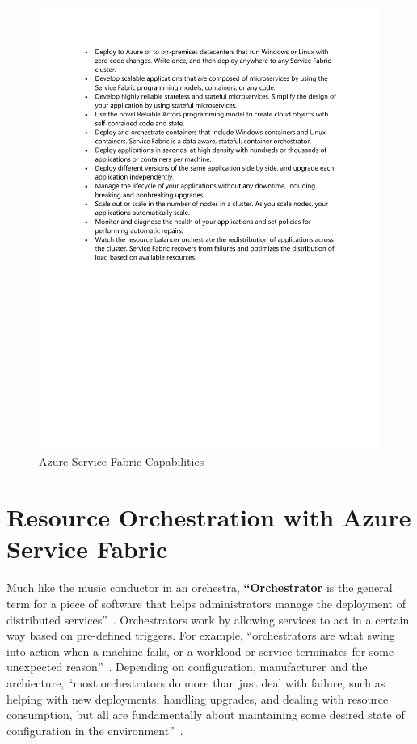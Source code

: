 \begin{figure}[!ht]
  \centering\includegraphics[width=\columnwidth]{images/fig2.pdf}
  \caption{Azure Service Fabric Capabilities~\cite{hid-sp18-501-overview}}
\label{f:architecture}
\end{figure}


\section{Resource Orchestration with Azure Service Fabric}
Much like the music conductor in an orchestra, {\bf ``Orchestrator} is the 
general term for a piece of software that
helps administrators manage the deployment of distributed
services''~\cite{hid-sp18-501-fig2and3}. Orchestrators work by allowing 
services to act in a certain
way based on pre-defined triggers. For example, 
``orchestrators are what
swing into action when a machine fails, or a workload or service
terminates for some unexpected reason''~\cite{hid-sp18-501-fig2and3}. 
Depending 
on configuration, manufacturer and the archiecture, ``most 
orchestrators do more than
just deal with failure, such as helping with new deployments, handling
upgrades, and dealing with resource consumption, but all are
fundamentally about maintaining some desired state of configuration in
the environment''~\cite{hid-sp18-501-fig2and3}.
 
